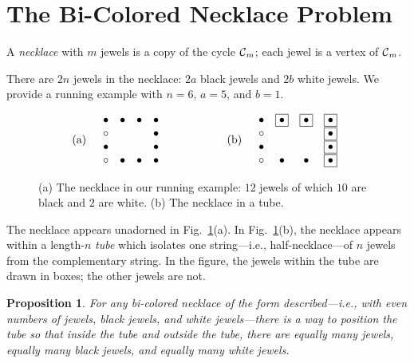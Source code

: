 \documentclass{article}
\newtheorem{prop}{Proposition}
\begin{document}
\section{The Bi-Colored Necklace Problem}


A {\it necklace} with $m$ jewels is a copy of the cycle $\mbox{$\cal C$}_m$; each jewel is a vertex of $\mbox{$\cal C$}_m$.

There are $2n$ jewels in the necklace: $2a$ black jewels and $2b$ white jewels.  We provide a  running example with $n = 6$, $a = 5$, and $b =1$.
\begin{figure}[hbt]
\[
\begin{array}{cccccc}
\mbox{(a)} & 
\begin{array}{cccc}
\bullet & \bullet  & \bullet & \bullet  \\
\circ    &             &            & \bullet  \\
\bullet &             &            & \bullet  \\
\circ    &  \bullet  & \bullet & \bullet
\end{array}
  & \hspace*{.5in} &
\mbox{(b)} & 
\begin{array}{cccc}
\bullet & \fbox{$\bullet$} & \fbox{$\bullet$} & \fbox{$\bullet$}  \\
\circ    &                          &                          & \fbox{$\bullet$}  \\
\bullet &                          &                          & \fbox{$\bullet$}  \\
\circ    &  \bullet              &   \bullet              & \fbox{$\bullet$}
\end{array}
\end{array}
\]
\caption{(a) The necklace in our running example: $12$ jewels of which $10$ are black and $2$ are white.  (b) The necklace in a tube.}
\label{fig:sample-necklace}
\end{figure}
The necklace appears unadorned in Fig.~\ref{fig:sample-necklace}(a).  In Fig.~\ref{fig:sample-necklace}(b), the necklace appears within a length-$n$ {\it tube} which isolates one string---i.e., half-necklace---of $n$ jewels from the complementary string.  In the figure, the jewels within the tube are drawn in boxes; the other jewels are not.


\smallskip

\begin{prop}
For any bi-colored necklace of the form described---i.e., with even numbers of jewels, black jewels, and white jewels---there is a way to position the tube so that inside the tube and outside the tube, there are equally many jewels, equally many black jewels, and equally many white jewels.
\end{prop} 
\end{document}

